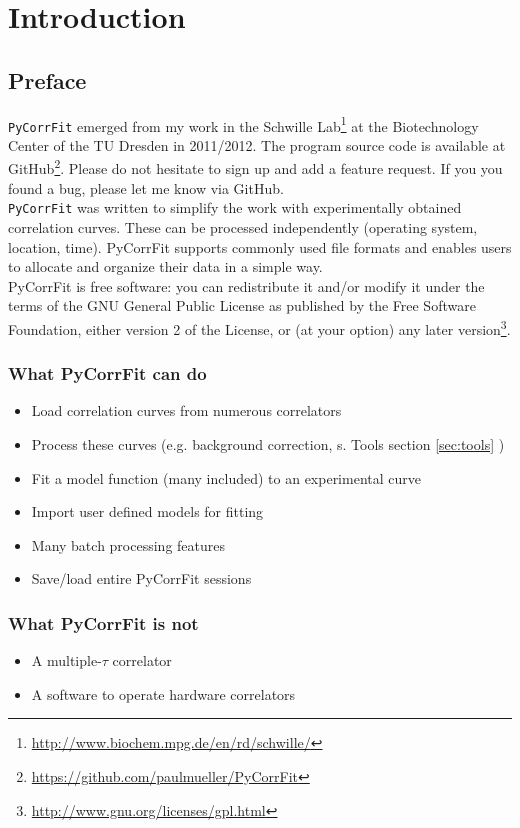 \section{Introduction}

\subsection{Preface}
\texttt{PyCorrFit} emerged from my work in the Schwille Lab\footnote{\url{http://www.biochem.mpg.de/en/rd/schwille/}} at the Biotechnology Center of the TU Dresden in 2011/2012. The program source code is available at GitHub\footnote{\url{https://github.com/paulmueller/PyCorrFit}}. Please do not hesitate to sign up and add a feature request. If you you found a bug, please let me know via GitHub.\\

\noindent \texttt{PyCorrFit} was written to simplify the work with experimentally obtained correlation curves. These can be processed independently (operating system, location, time). PyCorrFit supports commonly used file formats and enables users to allocate and organize their data in a simple way.\\

\noindent PyCorrFit is free software: you can redistribute it and/or modify it
under the terms of the GNU General Public License as published 
by the Free Software Foundation, either version 2 of the License, 
or (at your option) any later version\footnote{\url{http://www.gnu.org/licenses/gpl.html}}.

\subsubsection*{What PyCorrFit can do}
\begin{itemize}
\item Load correlation curves from numerous correlators
\item Process these curves (e.g. background correction, s. Tools section \ref{sec:tools} )
\item Fit a model function (many included) to an experimental curve
\item Import user defined models for fitting
\item Many batch processing features
\item Save/load entire PyCorrFit sessions
\end{itemize}

\subsubsection*{What PyCorrFit is not}
\begin{itemize}
\item A multiple-$\tau$ correlator
\item A software to operate hardware correlators
\end{itemize}

